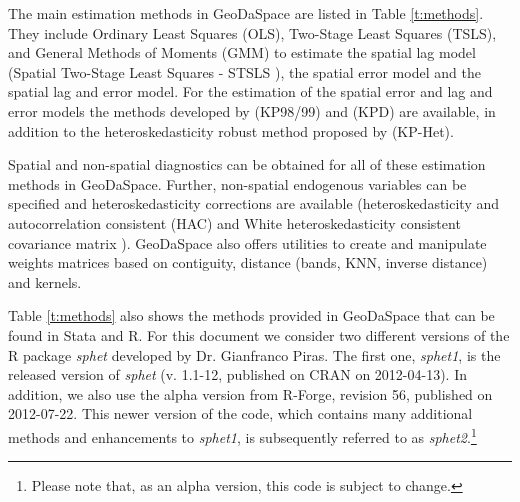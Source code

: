 \documentclass{article}
\begin{document}
The main estimation methods in GeoDaSpace are listed in Table \ref{t:methods}. They include Ordinary Least Squares (OLS), Two-Stage Least Squares (TSLS), and General Methods of Moments (GMM) to estimate the spatial lag model (Spatial Two-Stage Least Squares - STSLS \citep{Anselin88}), the spatial error model and the spatial lag and error model. For the estimation of the spatial error and lag and error models the methods developed by \citet{Kelejian98,Kelejian99} (KP98/99) and \citet{Drukker10} (KPD) are available, in addition to the heteroskedasticity robust method proposed by \citet{Arraiz10} (KP-Het).  

Spatial and non-spatial diagnostics can be obtained for all of these estimation methods in GeoDaSpace. Further, non-spatial endogenous variables can be specified and heteroskedasticity corrections are available (heteroskedasticity and autocorrelation consistent (HAC) \citep{Kelejian07} and White heteroskedasticity consistent covariance matrix \citep{White80}). GeoDaSpace also offers utilities to create and manipulate weights matrices based on contiguity, distance (bands, KNN, inverse distance) and kernels.

Table \ref{t:methods} also shows the methods provided in GeoDaSpace that can be found in Stata and R. For this document we consider two different versions of the R package \emph{sphet} developed by Dr. Gianfranco Piras. The first one, \emph{sphet1}, is the released version of \emph{sphet} (v. 1.1-12, published on CRAN on 2012-04-13). In addition, we also use the alpha version from R-Forge, revision 56, published on 2012-07-22. This newer version of the code, which contains many additional methods and enhancements to \emph{sphet1}, is subsequently referred to as \emph{sphet2}.\footnote{Please note that, as an alpha version, this code is subject to change.}
\end{document}
